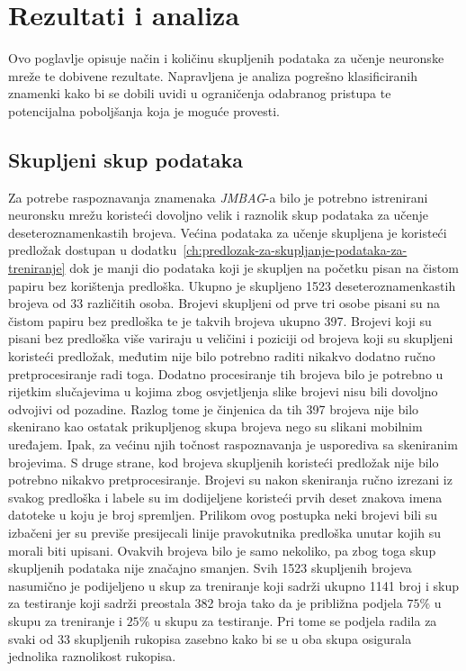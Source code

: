 \chapter{Rezultati i analiza}
\label{ch:rezultati-i-analiza}
Ovo poglavlje opisuje način i količinu skupljenih podataka za učenje neuronske mreže te dobivene rezultate. Napravljena
je analiza pogrešno klasificiranih znamenki kako bi se dobili uvidi u ograničenja odabranog pristupa te potencijalna
poboljšanja koja je moguće provesti.


\section{Skupljeni skup podataka}
\label{sec:skupljeni-skup-podataka}
Za potrebe raspoznavanja znamenaka \emph{JMBAG}-a bilo je potrebno istrenirani neuronsku mrežu koristeći dovoljno velik
i raznolik skup podataka za učenje deseteroznamenkastih brojeva. Većina podataka za učenje skupljena je koristeći
predložak dostupan u dodatku\ \ref{ch:predlozak-za-skupljanje-podataka-za-treniranje} dok je manji dio podataka koji je
skupljen na početku pisan na čistom papiru bez korištenja predloška. Ukupno je skupljeno 1523 deseteroznamenkastih
brojeva od 33 različitih osoba. Brojevi skupljeni od prve tri osobe pisani su na čistom papiru bez predloška te je
takvih brojeva ukupno 397. Brojevi koji su pisani bez predloška više variraju u veličini i poziciji od brojeva koji su
skupljeni koristeći predložak, međutim nije bilo potrebno raditi nikakvo dodatno ručno pretprocesiranje radi toga.
Dodatno procesiranje tih brojeva bilo je potrebno u rijetkim slučajevima u kojima zbog osvjetljenja slike brojevi nisu
bili dovoljno odvojivi od pozadine. Razlog tome je činjenica da tih 397 brojeva nije bilo skenirano kao ostatak
prikupljenog skupa brojeva nego su slikani mobilnim uređajem. Ipak, za većinu njih točnost raspoznavanja je usporediva
sa skeniranim brojevima. S druge strane, kod brojeva skupljenih koristeći predložak nije bilo potrebno nikakvo
pretprocesiranje. Brojevi su nakon skeniranja ručno izrezani iz svakog predloška i labele su im dodijeljene koristeći
prvih deset znakova imena datoteke u koju je broj spremljen. Prilikom ovog postupka neki brojevi bili su izbačeni jer su
previše presijecali linije pravokutnika predloška unutar kojih su morali biti upisani. Ovakvih brojeva bilo je samo
nekoliko, pa zbog toga skup skupljenih podataka nije značajno smanjen. Svih 1523 skupljenih brojeva nasumično je
podijeljeno u skup za treniranje koji sadrži ukupno 1141 broj i skup za testiranje koji sadrži preostala 382 broja
tako da je približna podjela $75\%$ u skupu za treniranje i $25\%$ u skupu za testiranje. Pri tome se podjela radila za
svaki od 33 skupljenih rukopisa zasebno kako bi se u oba skupa osigurala jednolika raznolikost rukopisa.


